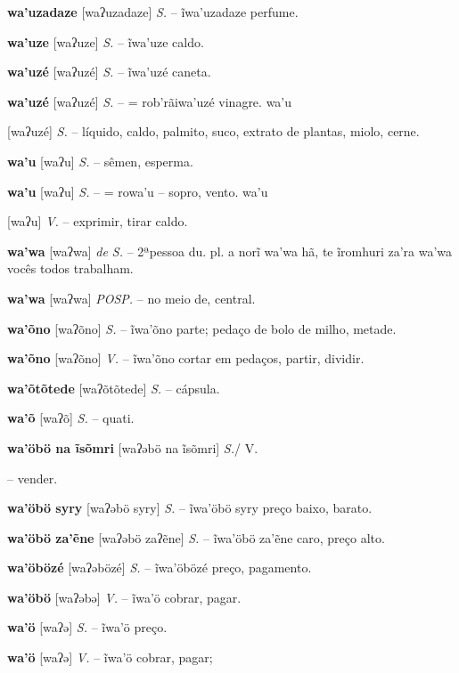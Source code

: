 {{{\textbf{wa'uzadaze} [waʔuzadaze] \textit{S.} -- ĩwa'uzadaze perfume.

\textbf{wa'uze} [waʔuze] \textit{S.} -- ĩwa'uze caldo.

\textbf{wa'uzé} [waʔuzé] \textit{S.} -- ĩwa'uzé caneta.

\textbf{wa'uzé} [waʔuzé] \textit{S.} -- = rob'rãiwa'uzé vinagre. wa'u} [waʔuzé] \textit{S.} -- líquido, caldo, palmito, suco, extrato de plantas, miolo, cerne.

\textbf{wa'u} [waʔu] \textit{S.} -- sêmen, esperma.

\textbf{wa'u} [waʔu] \textit{S.} -- = rowa'u -- sopro, vento. wa'u} [waʔu] \textit{V.} -- exprimir, tirar caldo.

\textbf{wa'wa} [waʔwa] \textit{de S.} -- 2ªpessoa du. pl. a norĩ wa'wa hã, te ĩromhuri za'ra wa'wa vocês todos trabalham.

\textbf{wa'wa} [waʔwa] \textit{POSP.} -- no meio de, central.

\textbf{wa'õno} [waʔõno] \textit{S.} -- ĩwa'õno parte; pedaço de bolo de milho, metade.

\textbf{wa'õno} [waʔõno] \textit{V.} -- ĩwa'õno cortar em pedaços, partir, dividir.

\textbf{wa'õtõtede} [waʔõtõtede] \textit{S.} -- cápsula.

\textbf{wa'õ} [waʔõ] \textit{S.} -- quati.

\textbf{wa'öbö na ĩsõmri} [waʔəbö na ĩsõmri] \textit{S.}/ V.} -- vender.

\textbf{wa'öbö syry} [waʔəbö syry] \textit{S.} -- ĩwa'öbö syry preço baixo, barato.

\textbf{wa'öbö za'ẽne} [waʔəbö zaʔẽne] \textit{S.} -- ĩwa'öbö za'ẽne caro, preço alto.

\textbf{wa'öbözé} [waʔəbözé] \textit{S.} -- ĩwa'öbözé preço, pagamento.

\textbf{wa'öbö} [waʔəbə] \textit{V.} -- ĩwa'ö cobrar, pagar.

\textbf{wa'ö} [waʔə] \textit{S.} -- ĩwa'ö preço.

\textbf{wa'ö} [waʔə] \textit{V.} -- ĩwa'ö cobrar, pagar;

